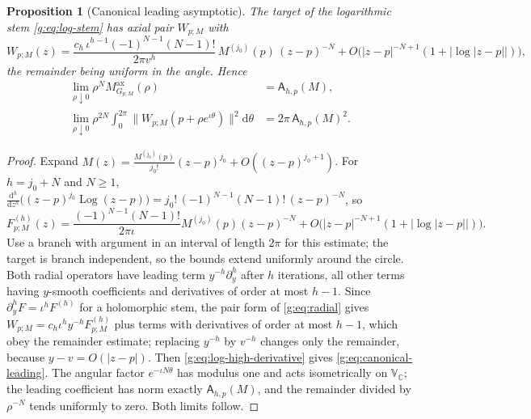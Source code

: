 \documentclass[11pt,a4paper]{article}
\numberwithin{equation}{section}
\newtheorem{proposition}[theorem]{Proposition}
\theoremstyle{definition}
\theoremstyle{remark}
\theoremstyle{plain}
\newcommand{\CC}{\mathbb C}
\newcommand{\Max}{M^{\mathrm{ax}}}                    %
\newcommand{\abs}[1]{\lvert #1\rvert}
\newcommand{\norm}[1]{\lVert #1\rVert}
\newcommand{\dd}{\mathrm d}
\newcommand{\VC}{\mathbb V_{\CC}}                 %
\begin{document}
\begin{proposition}[Canonical leading asymptotic]
\label{g:prop:canonical-asymptotic}
The target of the logarithmic stem \eqref{g:eq:log-stem} has axial pair
$W_{p;M}$ with
\begin{equation}\label{g:eq:canonical-leading}
 W_{p;M}(z)=\frac{c_h\,\iota^{h-1}(-1)^{N-1}(N-1)!}{2\pi v^h}\,
 M^{(j_0)}(p)\,(z-p)^{-N}
 +O\bigl(\abs{z-p}^{-N+1}(1+\abs{\log\abs{z-p}})\bigr),
\end{equation}
the remainder being uniform in the angle. Hence
\begin{align}
 \lim_{\rho\downarrow0}\rho^N\Max_{G_{p;M}}(\rho)&=\mathsf A_{h,p}(M),
 \label{g:eq:canonical-sup}\\
 \lim_{\rho\downarrow0}\rho^{2N}\int_0^{2\pi}
 \norm{W_{p;M}(p+\rho e^{\iota\theta})}^2\dd\theta&=2\pi\,\mathsf A_{h,p}(M)^2.
 \label{g:eq:canonical-circle}
\end{align}
\end{proposition}

\begin{proof}
Expand $M(z)=\frac{M^{(j_0)}(p)}{j_0!}(z-p)^{j_0}+O((z-p)^{j_0+1})$. For
$h=j_0+N$ and $N\ge1$,
$\frac{\dd^h}{\dd z^h}\bigl((z-p)^{j_0}\operatorname{Log}(z-p)\bigr)
=j_0!\,(-1)^{N-1}(N-1)!\,(z-p)^{-N}$, so
\begin{equation}\label{g:eq:log-high-derivative}
 F_{p;M}^{(h)}(z)=\frac{(-1)^{N-1}(N-1)!}{2\pi\iota}M^{(j_0)}(p)(z-p)^{-N}
 +O\bigl(\abs{z-p}^{-N+1}(1+\abs{\log\abs{z-p}})\bigr).
\end{equation}
Use a branch with argument in an interval of length $2\pi$ for this estimate;
the target is branch independent, so the bounds extend uniformly around the
circle. Both radial operators have leading term $y^{-h}\partial_y^h$ after $h$
iterations, all other terms having $y$-smooth coefficients and derivatives of
order at most $h-1$. Since $\partial_y^hF=\iota^hF^{(h)}$ for a holomorphic stem,
the pair form of \eqref{g:eq:radial} gives $W_{p;M}=c_h\iota^hy^{-h}F^{(h)}_{p;M}$
plus terms with derivatives of order at most $h-1$, which obey the remainder
estimate; replacing $y^{-h}$ by $v^{-h}$ changes only the remainder, because
$y-v=O(\abs{z-p})$. Then \eqref{g:eq:log-high-derivative} gives
\eqref{g:eq:canonical-leading}. The angular factor $e^{-\iota N\theta}$ has
modulus one and acts isometrically on $\VC$; the leading coefficient has norm
exactly $\mathsf A_{h,p}(M)$, and the remainder divided by $\rho^{-N}$ tends
uniformly to zero. Both limits follow.
\end{proof}
\end{document}
